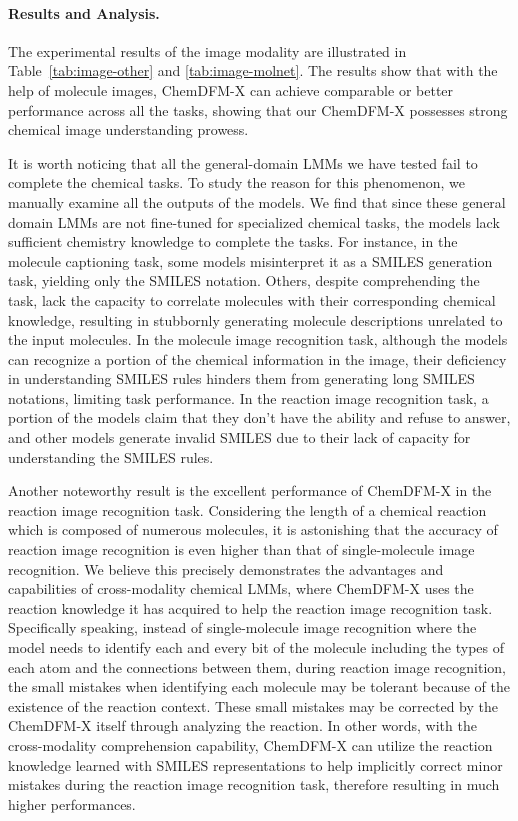 \paragraph{Results and Analysis.} The experimental results of the image modality are illustrated in Table~\ref{tab:image-other} and \ref{tab:image-molnet}. The results show that with the help of molecule images, ChemDFM-X can achieve comparable or better performance across all the tasks, showing that our ChemDFM-X possesses strong chemical image understanding prowess.

It is worth noticing that all the general-domain LMMs we have tested fail to complete the chemical tasks. To study the reason for this phenomenon, we manually examine all the outputs of the models. We find that since these general domain LMMs are not fine-tuned for specialized chemical tasks, the models lack sufficient chemistry knowledge to complete the tasks. For instance, in the molecule captioning task, some models misinterpret it as a SMILES generation task, yielding only the SMILES notation. Others, despite comprehending the task, lack the capacity to correlate molecules with their corresponding chemical knowledge, resulting in stubbornly generating molecule descriptions unrelated to the input molecules. In the molecule image recognition task, although the models can recognize a portion of the chemical information in the image, their deficiency in understanding SMILES rules hinders them from generating long SMILES notations, limiting task performance. In the reaction image recognition task, a portion of the models claim that they don't have the ability and refuse to answer, and other models generate invalid SMILES due to their lack of capacity for understanding the SMILES rules.

Another noteworthy result is the excellent performance of ChemDFM-X in the reaction image recognition task. Considering the length of a chemical reaction which is composed of numerous molecules, it is astonishing that the accuracy of reaction image recognition is even higher than that of single-molecule image recognition. We believe this precisely demonstrates the advantages and capabilities of cross-modality chemical LMMs, where ChemDFM-X uses the reaction knowledge it has acquired to help the reaction image recognition task. Specifically speaking, instead of single-molecule image recognition where the model needs to identify each and every bit of the molecule including the types of each atom and the connections between them, during reaction image recognition, the small mistakes when identifying each molecule may be tolerant because of the existence of the reaction context. These small mistakes may be corrected by the ChemDFM-X itself through analyzing the reaction. In other words, with the cross-modality comprehension capability, ChemDFM-X can utilize the reaction knowledge learned with SMILES representations to help implicitly correct minor mistakes during the reaction image recognition task, therefore resulting in much higher performances.


